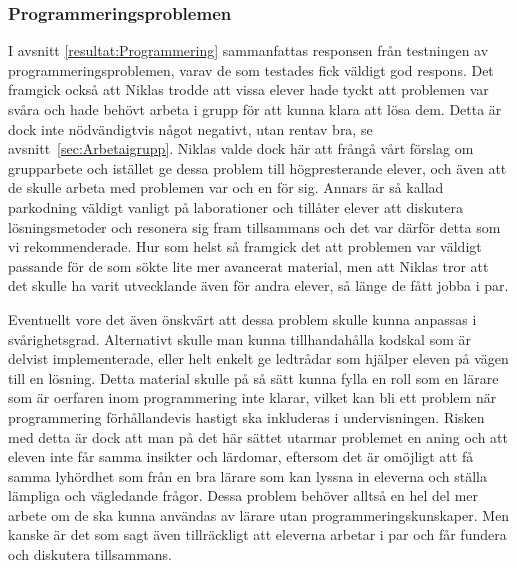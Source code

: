 \subsubsection{Programmeringsproblemen}
    \textcolor{Mahogany}{I avsnitt \ref{resultat:Programmering} sammanfattas responsen från testningen av programmeringsproblemen, varav de som testades fick  väldigt god respons. Det framgick också att Niklas trodde att vissa elever hade tyckt att problemen var svåra och hade behövt arbeta i grupp för att kunna klara att lösa dem. Detta är dock inte nödvändigtvis något negativt, utan rentav bra, se avsnitt~\ref{sec:Arbetaigrupp}. Niklas valde dock här att frångå vårt förslag om grupparbete och istället ge dessa problem till högpresterande elever, och även att de skulle arbeta med problemen var och en för sig. Annars är så kallad parkodning väldigt vanligt på laborationer och tillåter elever att diskutera lösningsmetoder och resonera sig fram tillsammans och det var därför detta som vi rekommenderade. Hur som helst så framgick det att problemen var väldigt passande för de som sökte lite mer avancerat material, men att Niklas tror att det skulle ha varit utvecklande även för andra elever, så länge de fått jobba i par.}

    \textcolor{Mahogany}{Eventuellt vore det även önskvärt att dessa problem skulle kunna anpassas i svårighetsgrad. Alternativt skulle man kunna tillhandahålla kodskal som är delvist implementerade, eller helt enkelt ge ledtrådar som hjälper eleven på vägen till en lösning.} \textcolor{lila}{Detta material skulle på så sätt kunna fylla en roll som en lärare som är oerfaren inom programmering inte klarar, vilket kan bli ett problem när programmering förhållandevis hastigt ska inkluderas i undervisningen.} 
    \textcolor{Mahogany}{Risken med detta är dock att man på det här sättet utarmar problemet en aning och att eleven inte får samma insikter och lärdomar,} 
    \textcolor{lila}{eftersom det är omöjligt att få samma lyhördhet som från en bra lärare som kan lyssna in eleverna och ställa lämpliga och vägledande frågor. Dessa problem behöver alltså en hel del mer arbete om de ska kunna användas av lärare utan programmeringskunskaper.} 
    \textcolor{Mahogany}{Men kanske är det som sagt även tillräckligt att eleverna arbetar i par och får fundera och diskutera tillsammans.}
    
